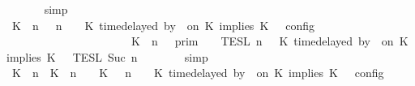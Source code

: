 \begin{isabellebody}
\ \ \ \ \ \ \isamarkupfalse%
\ simp\isanewline
\ \ \ \ \isamarkupfalse%
\ \isamarkupfalse%
\ {\isacartoucheopen}{\isasymlbrakk}\ {\isacharparenleft}{\isacharparenleft}K\ {\isasymnot}{\isasymUp}\ n{\isacharparenright}\ {\isacharhash}\ {\isasymGamma}{\isacharparenright}{\isacharcomma}\ n\ {\isasymturnstile}\ {\isasymPsi}\ {\isasymtriangleright}\ {\isacharparenleft}{\isacharparenleft}K\ time{\isacharminus}delayed\ by\ {\isasymdelta}{\isasymtau}\ on\ K\ implies\ K\ {\isacharhash}\ {\isasymPhi}{\isacharparenright}\ {\isasymrbrakk}\isactrlsub c\isactrlsub o\isactrlsub n\isactrlsub f\isactrlsub i\isactrlsub g\isanewline
\ \ \ \ \ \ \ \ \ \ \ \ \ \ \ \ \ \ \ \ \ {\isacharequal}\ {\isasymlbrakk}{\isasymlbrakk}\ {\isacharparenleft}K\ {\isasymnot}{\isasymUp}\ n{\isacharparenright}\ {\isacharhash}\ {\isasymGamma}\ {\isasymrbrakk}{\isasymrbrakk}\isactrlsub p\isactrlsub r\isactrlsub i\isactrlsub m\ {\isasyminter}\ {\isasymlbrakk}{\isasymlbrakk}\ {\isasymPsi}\ {\isasymrbrakk}{\isasymrbrakk}\isactrlsub T\isactrlsub E\isactrlsub S\isactrlsub L\isactrlbsup {\isasymge}\ n\isactrlesup \ {\isasyminter}\ {\isasymlbrakk}{\isasymlbrakk}\ {\isacharparenleft}K\ time{\isacharminus}delayed\ by\ {\isasymdelta}{\isasymtau}\ on\ K\ implies\ K\ {\isacharhash}\ {\isasymPhi}\ {\isasymrbrakk}{\isasymrbrakk}\isactrlsub T\isactrlsub E\isactrlsub S\isactrlsub L\isactrlbsup {\isasymge}\ Suc\ n\isactrlesup {\isacartoucheclose}\isanewline
\ \ \ \ \ \ \isamarkupfalse%
\ simp\isanewline
\ \ \ \ \isamarkupfalse%
\ \isamarkupfalse%
\ {\isacartoucheopen}{\isasymlbrakk}\ {\isacharparenleft}{\isacharparenleft}K\ {\isasymUp}\ n{\isacharparenright}\ {\isacharhash}\ {\isacharparenleft}K\ {\isacharat}\ n\ {\isasymoplus}\ {\isasymdelta}{\isasymtau}\ {\isasymRightarrow}\ K\ {\isacharhash}\ {\isasymGamma}{\isacharparenright}{\isacharcomma}\ n\ {\isasymturnstile}\ {\isasymPsi}\ {\isasymtriangleright}\ {\isacharparenleft}{\isacharparenleft}K\ time{\isacharminus}delayed\ by\ {\isasymdelta}{\isasymtau}\ on\ K\ implies\ K\ {\isacharhash}\ {\isasymPhi}{\isacharparenright}\ {\isasymrbrakk}\isactrlsub c\isactrlsub o\isactrlsub n\isactrlsub f\isactrlsub i\isactrlsub g\isanewline

\end{isabellebody}
